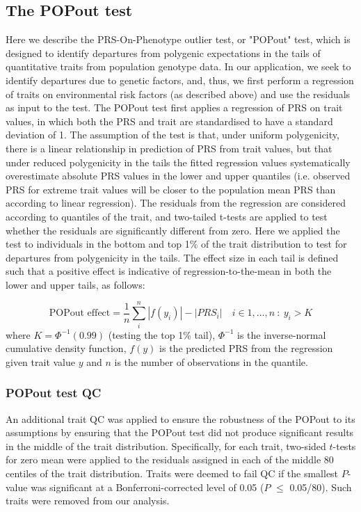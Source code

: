 \documentclass[12pt]{zHenriquesLab-StyleBioRxiv}
\begin{document}
{{\vspace*{0.3cm} 
\subsection*{The POPout test}} \label{sec:methods:popout} 
Here we describe the PRS-On-Phenotype outlier test, or "POPout" test, which is 
designed to identify departures from polygenic expectations in the tails of 
quantitative traits from population genotype data. In our application, we seek to identify 
departures due to genetic factors, and, thus, we first perform a regression of traits on 
environmental risk factors (as described above) and use the residuals as input to the test. 
The POPout test first applies a regression of PRS on trait values, in which both the 
PRS and trait are standardised to have a standard deviation of 1. The assumption of the 
test is that, under uniform polygenicity, there is a linear relationship in prediction 
of PRS from trait values, but that under reduced polygenicity in the tails the 
fitted regression values systematically overestimate absolute PRS values in the 
lower and upper quantiles (i.e. observed PRS for extreme trait values will be 
closer to the population mean PRS than according to linear regression). 
The residuals from the regression are considered according to quantiles of the trait, 
and two-tailed t-tests are applied to test whether the residuals are significantly different from zero. 
Here we applied the test to individuals in the bottom and top 1\% of the trait 
distribution to test for departures from polygenicity in the tails. The effect 
size in each tail is defined such that a positive effect is indicative of 
regression-to-the-mean in both the lower and upper tails, as follows:

\[
\text{POPout effect} = \frac{1}{n}\sum_i^n |{f(y_i)}| - |{PRS_i}|\quad
                         {i\in{1,\dots,n} \ : \ y_i >K}
\]
where $K=\Phi^{-1}(0.99)$ (testing the top 1\% tail), $\Phi^{-1}$ is
the inverse-normal cumulative density function, $f(y)$ is the
predicted PRS from the regression given trait value $y$ and $n$ is the
number of observations in the quantile.

\subsubsection*{POPout test QC}
An additional trait QC was applied to ensure the robustness of the
POPout to its assumptions by ensuring that the POPout test 
did not produce significant results in the middle of the trait distribution. 
Specifically, for each trait, two-sided $t$-tests for zero mean were
applied to the residuals assigned in each of the middle 80 centiles of
the trait distribution. Traits were deemed to fail QC if the smallest
$P$-value was significant at a Bonferroni-corrected level of 0.05 ($P$
$\le$ 0.05/80). Such traits were removed from our analysis.

}
\end{document}
